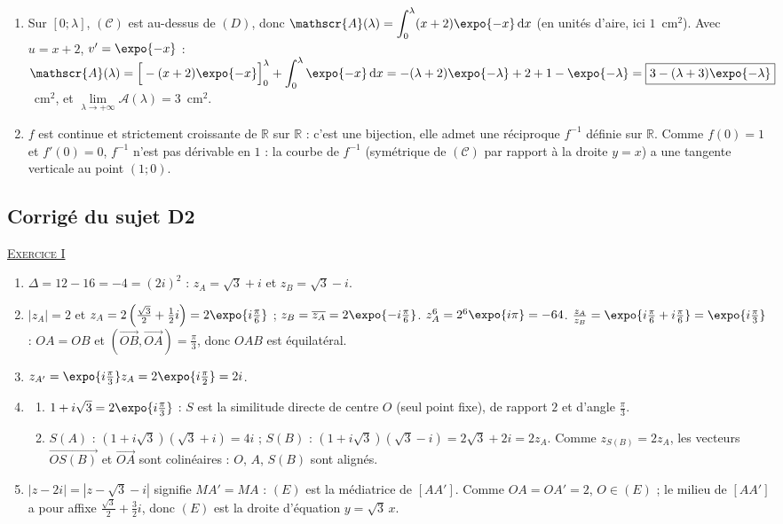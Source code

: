 \begin{corrige}
\begin{enumerate}
\item Sur $[0 ; \lambda]$, $(\mathscr{C})$ est au-dessus de $(D)$, donc
      $\mathscr{A}(\lambda) = \displaystyle\int_0^\lambda (x+2)\expo{-x}\,\mathrm{d}x$ (en unit\'es d'aire, ici $1$~cm$^2$).
      Avec $u = x + 2$, $v' = \expo{-x}$ :
      $\mathscr{A}(\lambda) = \Big[-(x+2)\expo{-x}\Big]_0^\lambda + \displaystyle\int_0^\lambda \expo{-x}\,\mathrm{d}x
      = -(\lambda + 2)\expo{-\lambda} + 2 + 1 - \expo{-\lambda} = \boxed{3 - (\lambda + 3)\expo{-\lambda}}$~cm$^2$,
      et $\lim\limits_{\lambda \to +\infty} \mathscr{A}(\lambda) = 3$~cm$^2$.
\item $f$ est continue et strictement croissante de $\mathbb{R}$ sur $\mathbb{R}$ : c'est une bijection, elle admet une r\'eciproque
      $f^{-1}$ d\'efinie sur $\mathbb{R}$. Comme $f(0) = 1$ et $f'(0) = 0$, $f^{-1}$ n'est pas d\'erivable en $1$ : la courbe de $f^{-1}$
      (sym\'etrique de $(\mathscr{C})$ par rapport \`a la droite $y = x$) a une tangente verticale au point $(1 ; 0)$.
\end{enumerate}

\subsection{Corrig\'e du sujet D2}
\noindent \underline{\textsc{Exercice I}}
\begin{enumerate}
\item $\Delta = 12 - 16 = -4 = (2i)^2$ : $z_A = \sqrt{3} + i$ et $z_B = \sqrt{3} - i$.
\item $|z_A| = 2$ et $z_A = 2\left(\frac{\sqrt{3}}{2} + \frac{1}{2}i\right) = 2\expo{i\frac{\pi}{6}}$ ; $z_B = \overline{z_A} = 2\expo{-i\frac{\pi}{6}}$.
      $z_A^6 = 2^6\expo{i\pi} = -64$. $\frac{z_A}{z_B} = \expo{i\frac{\pi}{6} + i\frac{\pi}{6}} = \expo{i\frac{\pi}{3}}$ :
      $OA = OB$ et $(\overrightarrow{OB}, \overrightarrow{OA}) = \frac{\pi}{3}$, donc $OAB$ est \'equilat\'eral.
\item $z_{A'} = \expo{i\frac{\pi}{3}} z_A = 2\expo{i\frac{\pi}{2}} = 2i$.
\item \begin{enumerate}
      \item $1 + i\sqrt{3} = 2\expo{i\frac{\pi}{3}}$ : $S$ est la similitude directe de centre $O$ (seul point fixe),
            de rapport $2$ et d'angle $\frac{\pi}{3}$.
      \item $S(A)$ : $(1 + i\sqrt{3})(\sqrt{3} + i) = 4i$ ; $S(B)$ : $(1 + i\sqrt{3})(\sqrt{3} - i) = 2\sqrt{3} + 2i = 2 z_A$.
            Comme $z_{S(B)} = 2 z_A$, les vecteurs $\overrightarrow{OS(B)}$ et $\overrightarrow{OA}$ sont colin\'eaires :
            $O$, $A$, $S(B)$ sont align\'es.
      \end{enumerate}
\item $|z - 2i| = |z - \sqrt{3} - i|$ signifie $MA' = MA$ : $(E)$ est la m\'ediatrice de $[AA']$.
      Comme $OA = OA' = 2$, $O \in (E)$ ; le milieu de $[AA']$ a pour affixe $\frac{\sqrt{3}}{2} + \frac{3}{2}i$,
      donc $(E)$ est la droite d'\'equation $y = \sqrt{3}\,x$.
\end{enumerate}


\end{corrige}
